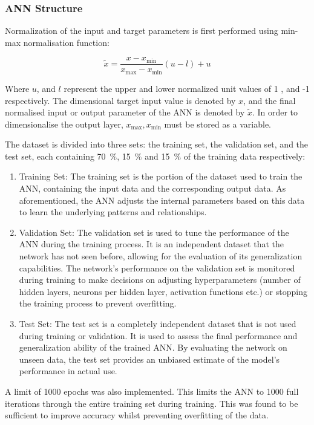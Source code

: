 \subsubsection{ANN Structure}
Normalization of the input and target parameters is first performed using min-max normalisation function:

\begin{equation}
	\tilde{x}=\frac{x-x_{\min }}{x_{\max }-x_{\min }}(u-l)+u
\end{equation}

Where $u$, and $l$ represent the upper and lower normalized unit values of 1 , and -1 respectively. The dimensional target input value is denoted by $x$, and the final normalised input or output parameter of the ANN is denoted by $\tilde{x}$. In order to dimensionalise the output layer, $x_{\max }, x_{\min }$ must be stored as a variable.

The dataset is divided into three sets: the training set, the validation set, and the test set, each containing 70~$\%$, 15~$\%$ and 15~$\%$ of the training data respectively:

\begin{enumerate}
	\item Training Set: The training set is the portion of the dataset used to train the ANN, containing the input data and the corresponding output data. As aforementioned, the ANN adjusts the internal parameters based on this data to learn the underlying patterns and relationships.
	\item Validation Set: The validation set is used to tune the performance of the ANN during the training process. It is an independent dataset that the network has not seen before, allowing for the evaluation of its generalization capabilities. The network's performance on the validation set is monitored during training to make decisions on adjusting hyperparameters (number of hidden layers, neurons per hidden layer, activation functions etc.) or stopping the training process to prevent overfitting.
	\item Test Set: The test set is a completely independent dataset that is not used during training or validation. It is used to assess the final performance and generalization ability of the trained ANN. By evaluating the network on unseen data, the test set provides an unbiased estimate of the model's performance in actual use.
\end{enumerate}

A limit of 1000 epochs was also implemented. This limits the ANN to 1000 full iterations through the entire training set during training. This was found to be sufficient to improve accuracy whilst preventing overfitting of the data.

